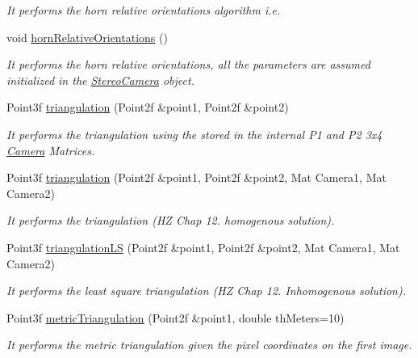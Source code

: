 \begin{DoxyCompactItemize}
\begin{DoxyCompactList}\small\item\em It performs the horn relative orientations algorithm i.\+e. \end{DoxyCompactList}\item 
void \mbox{\hyperlink{classStereoCamera_a36dae897d07544e8faca8c90216173a6}{horn\+Relative\+Orientations}} ()
\begin{DoxyCompactList}\small\item\em It performs the horn relative orientations, all the parameters are assumed initialized in the \mbox{\hyperlink{classStereoCamera}{Stereo\+Camera}} object. \end{DoxyCompactList}\item 
Point3f \mbox{\hyperlink{classStereoCamera_a3c8ef84424fa111c63437a3db8f04333}{triangulation}} (Point2f \&point1, Point2f \&point2)
\begin{DoxyCompactList}\small\item\em It performs the triangulation using the stored in the internal P1 and P2 3x4 \mbox{\hyperlink{classCamera}{Camera}} Matrices. \end{DoxyCompactList}\item 
Point3f \mbox{\hyperlink{classStereoCamera_ab68c8d3bd07f542243d681fbe8c8c6b7}{triangulation}} (Point2f \&point1, Point2f \&point2, Mat Camera1, Mat Camera2)
\begin{DoxyCompactList}\small\item\em It performs the triangulation (HZ Chap 12. homogenous solution). \end{DoxyCompactList}\item 
Point3f \mbox{\hyperlink{classStereoCamera_aaef25d8723eefdbab6e27c348492126b}{triangulation\+LS}} (Point2f \&point1, Point2f \&point2, Mat Camera1, Mat Camera2)
\begin{DoxyCompactList}\small\item\em It performs the least square triangulation (HZ Chap 12. Inhomogenous solution). \end{DoxyCompactList}\item 
Point3f \mbox{\hyperlink{classStereoCamera_a2fcd3e1767bcf04716b0e2ac76098430}{metric\+Triangulation}} (Point2f \&point1, double th\+Meters=10)
\begin{DoxyCompactList}\small\item\em It performs the metric triangulation given the pixel coordinates on the first image. \end{DoxyCompactList}\item 

\end{DoxyCompactItemize}
